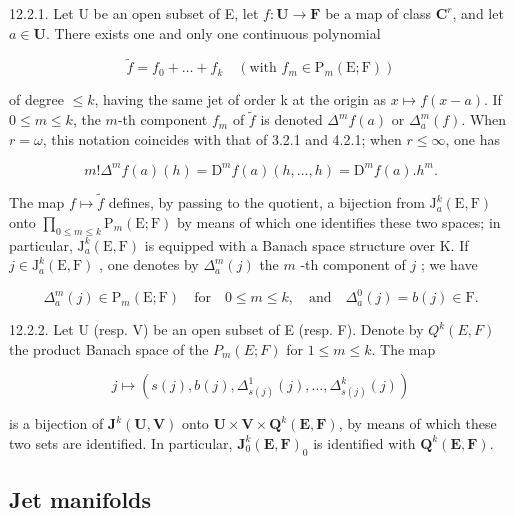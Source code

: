 12.2.1. Let U be an open subset of E, let \(f\colon\mathbf{U}\to\mathbf{F}\) be a map of class \(\mathbf{C}^{r}\), and let \(a\in\mathbf{U}\). There exists one and only one continuous polynomial

\[
\tilde {f} = f _ {0} + \dots + f _ {k} \quad (\text{with }f _ {m} \in \mathrm{P} _ {m} (\mathrm{E}; \mathrm{F}))
\]

of degree \(\leqslant k\), having the same jet of order k at the origin as \(x \mapsto f(x - a)\). If \(0 \leqslant m \leqslant k\), the \(m\)-th component \(f_m\) of \(\tilde{f}\) is denoted \(\Delta^m f(a)\) or \(\Delta_a^m(f)\). When \(r = \omega\), this notation coincides with that of 3.2.1 and 4.2.1; when \(r \leqslant \infty\), one has

\[
m! \Delta^ {m} f (a) (h) = \mathrm{D} ^ {m} f (a) (h, \dots , h) = \mathrm{D} ^ {m} f (a). h ^ {m}.
\]

The map \(f\mapsto\tilde{f}\) defines, by passing to the quotient, a bijection from \(\mathrm{J}_{a}^{k}(\mathrm{E},\mathrm{F})\) onto \(\prod_{0\leqslant m\leqslant k}\mathrm{P}_{m}(\mathrm{E};\mathrm{F})\) by means of which one identifies these two spaces; in particular, \(\mathrm{J}_{a}^{k}(\mathrm{E},\mathrm{F})\) is equipped with a Banach space structure over K. If \(j\in\mathrm{J}_{a}^{k}(\mathrm{E},\mathrm{F})\) , one denotes by \(\Delta_{a}^{m}(j)\) the \(m\) -th component of \(j\) ; we have

\[
\Delta_ {a} ^ {m} (j) \in \mathrm{P} _ {m} (\mathrm{E}; \mathrm{F}) \quad \text {for} \quad 0 \leqslant m \leqslant k, \quad \text {and} \quad \Delta_ {a} ^ {0} (j) = b (j) \in \mathrm{F}.
\]

12.2.2. Let U (resp. V) be an open subset of E (resp. F). Denote by \(Q^{k}(E, F)\) the product Banach space of the \(P_{m}(E; F)\) for \(1 \leqslant m \leqslant k\). The map

\[
j \mapsto (s (j), b (j), \Delta_ {s (j)} ^ {1} (j), \dots , \Delta_ {s (j)} ^ {k} (j))
\]

is a bijection of \(\mathbf{J}^{k}(\mathbf{U},\mathbf{V})\) onto \(\mathbf{U}\times\mathbf{V}\times\mathbf{Q}^{k}(\mathbf{E},\mathbf{F})\), by means of which these two sets are identified. In particular, \(\mathbf{J}_{0}^{k}(\mathbf{E},\mathbf{F})_{0}\) is identified with \(\mathbf{Q}^{k}(\mathbf{E},\mathbf{F})\).

\subsection{Jet manifolds}

